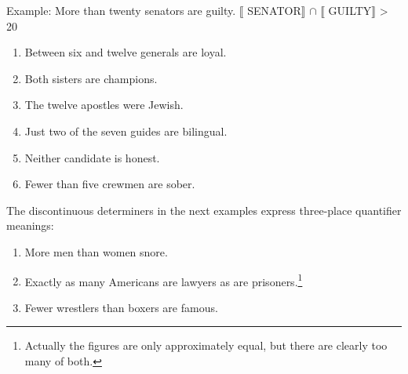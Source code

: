 \begin{stylepoints}
\textsf{Example:} \textsf{More than twenty}\textsf{ senators are guilty.   {\textbar}} $\llbracket$ \textsf{SENATOR}$\rrbracket$ \textsf{ ${\cap}$} $\llbracket$ \textsf{GUILTY}$\rrbracket$ \textsf{ {\textbar} > 20}
\end{stylepoints}

\begin{enumerate}
\item Between six and twelve generals are loyal.
\item Both sisters are champions.
\item The twelve apostles were Jewish.
\item Just two of the seven guides are bilingual.
\item Neither candidate is honest.
\item Fewer than five crewmen are sober.
\end{enumerate}

The discontinuous determiners in the next examples express three-place quantifier meanings:

\begin{enumerate}
\item More men than women snore.
\item Exactly as many Americans are lawyers as are prisoners.\footnote{Actually the figures are only approximately equal, but there are clearly too many of both.}
\item Fewer wrestlers than boxers are famous.
\end{enumerate}

